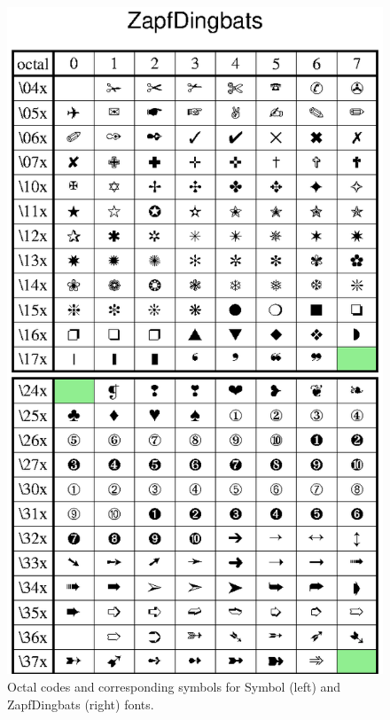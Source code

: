 \begin{figure}[h]
   \includegraphics[scale=0.92]{scripts/GMT_App_F_dingbats}
   \caption{Octal codes and corresponding symbols for Symbol (left)
   and ZapfDingbats (right) fonts.}
   \label{fig:GMT_App_F_symbol}
\end{figure}
